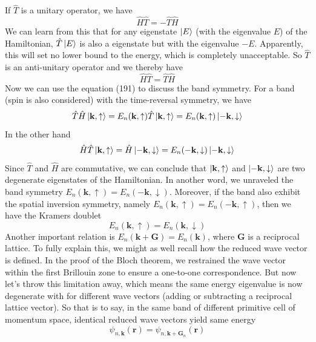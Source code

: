 \documentclass{article}
\begin{document}
If $\hat{T}$ is a unitary operator, we have\begin{equation}
    \hat{H}\hat{T}=-\hat{T}\hat{H}
\end{equation}
We can learn from this that for any eigenstate $\ket{E}$ (with the eigenvalue $E$) of the Hamiltonian, $\hat{T}\ket{E}$ is also a eigenstate but with the eigenvalue $-E$. Apparently, this will set no lower bound to the energy, which is completely unacceptable. So $\hat{T}$ is an anti-unitary operator and we thereby have\begin{equation}
    \hat{H}\hat{T}=\hat{T}\hat{H}
\end{equation}
Now we can use the equation (191) to discuss the band symmetry. For a band (spin is also considered) with the time-reversal symmetry, we have\begin{equation}
    \hat{T}\hat{H}\ket{\mathbf{k},\uparrow}=E_n(\mathbf{k},\uparrow)\hat{T}\ket{\mathbf{k},\uparrow}=E_n(\mathbf{k},\uparrow)\ket{-\mathbf{k},\downarrow}
\end{equation}In the other hand\begin{equation}
    \hat{H}\hat{T}\ket{\mathbf{k},\uparrow}=\hat{H}\ket{-\mathbf{k},\downarrow}=E_n(-\mathbf{k},\downarrow)\ket{-\mathbf{k},\downarrow}
\end{equation}
Since $\hat{T}$ and $\hat{H}$ are commutative, we can conclude that $\ket{\mathbf{k},\uparrow}$ and $\ket{-\mathbf{k},\downarrow}$ are two degenerate eigenstates of the Hamiltonian. In another word, we unraveled the band symmetry $E_n(\mathbf{k},\uparrow)=E_n(-\mathbf{k},\downarrow)$. Moreover, if the band also exhibit the spatial inversion symmetry, namely $E_n(\mathbf{k},\uparrow)=E_n(-\mathbf{k},\uparrow)$, then we have the Kramers doublet\begin{equation}
    E_n(\mathbf{k},\uparrow)=E_n(\mathbf{k},\downarrow)
\end{equation}
Another important relation is $E_n(\mathbf{k}+\mathbf{G})=E_n(\mathbf{k})$, where $\mathbf{G}$ is a reciprocal lattice. To fully explain this, we might as well recall how the reduced wave vector is defined. In the proof of the Bloch theorem, we restrained the wave vector within the first Brillouin zone to ensure a one-to-one correspondence. But now let's throw this limitation away, which means the same energy eigenvalue is now degenerate with for different wave vectors (adding or subtracting a reciprocal lattice vector). So that is to say, in the same band of different primitive cell of momentum space, identical reduced wave vectors yield same energy\begin{equation}
    \psi_{n,\mathbf{k}}(\mathbf{r})=\psi_{n,\mathbf{k}+\mathbf{G}_n}(\mathbf{r})
\end{equation}
\end{document}
